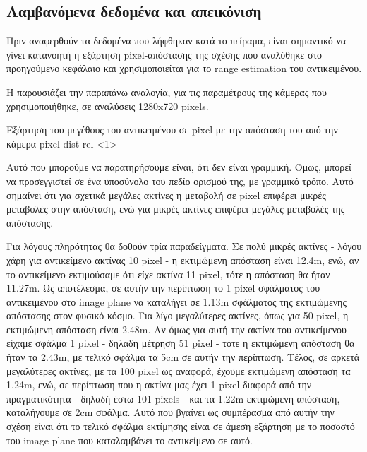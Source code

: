 
\subsection{Λαμβανόμενα δεδομένα και απεικόνιση} \label{sec:expe-single-3d}

Πριν αναφερθούν τα δεδομένα που λήφθηκαν κατά το πείραμα, είναι σημαντικό να γίνει κατανοητή η εξάρτηση pixel-απόστασης της σχέσης  που αναλύθηκε στο προηγούμενο κεφάλαιο και χρησιμοποιείται για το range estimation του αντικειμένου.

Η  παρουσιάζει την παραπάνω αναλογία, για τις παραμέτρους της κάμερας που χρησιμοποιήθηκε, σε αναλύσεις 1280x720 pixels.

{Εξάρτηση του μεγέθους του αντικειμένου σε pixel με την απόσταση του από την κάμερα}%
{pixel-dist-rel}%
<1>

Αυτό που μπορούμε να παρατηρήσουμε είναι, ότι δεν είναι γραμμική. Όμως, μπορεί να προσεγγιστεί σε ένα υποσύνολο του πεδίο ορισμού της, με γραμμικό τρόπο. Αυτό σημαίνει ότι για σχετικά μεγάλες ακτίνες η μεταβολή σε pixel επιφέρει μικρές με\-τα\-βο\-λές στην απόσταση, ενώ για μικρές ακτίνες επιφέρει μεγάλες μεταβολές της απόστασης. 

Για λόγους πληρότητας θα δοθούν τρία παραδείγματα. Σε πολύ μικρές ακτίνες - λόγου χάρη για αντικείμενο ακτίνας 10 pixel - η εκτιμώμενη απόσταση είναι 12.4m, ενώ, αν το αντικείμενο εκτιμούσαμε ότι είχε ακτίνα 11 pixel, τότε η απόσταση θα ήταν 11.27m. Ως αποτέλεσμα, σε αυτήν την περίπτωση το 1 pixel σφάλματος του αντικειμένου στο image plane να καταλήγει σε 1.13m σφάλματος της εκτιμώμενης απόστασης στον φυσικό κόσμο. Για λίγο μεγαλύτερες ακτίνες, όπως για 50 pixel, η εκτιμώμενη απόσταση είναι 2.48m. Αν όμως για αυτή την ακτίνα του αντικείμενου είχαμε σφάλμα 1 pixel - δηλαδή μέτρηση 51 pixel - τότε η εκτιμώμενη απόσταση θα ήταν τα 2.43m, με τελικό σφάλμα τα 5cm σε αυτήν την περίπτωση. Τέλος, σε αρκετά μεγαλύτερες ακτίνες, με τα 100 pixel ως αναφορά, έχουμε εκτιμώμενη α\-πό\-στα\-ση τα 1.24m, ενώ, σε περίπτωση που η ακτίνα μας έχει 1 pixel διαφορά από την πραγματικότητα - δηλαδή έστω 101 pixels - και τα 1.22m εκτιμώμενη απόσταση, καταλήγουμε σε 2cm σφάλμα. Αυτό που βγαίνει ως συμπέρασμα από αυτήν την σχέση είναι ότι το τελικό σφάλμα εκτίμησης είναι σε άμεση εξάρτηση με το ποσοστό του image plane που καταλαμβάνει το αντικείμενο σε αυτό. 

